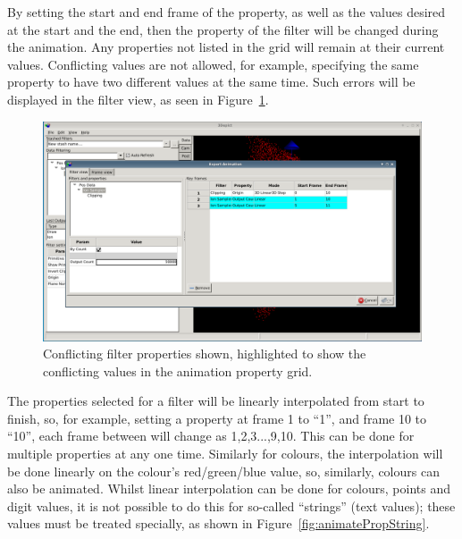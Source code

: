 \documentclass[10pt]{article}
\begin{document}
By setting the start and end frame of the property, as well as the values desired at the start and the end, then the property of the filter will be changed during the animation. Any properties not listed in the grid will remain at their current values. Conflicting values are not allowed, for example, specifying the same property to have two different values at the same time. Such errors will be displayed in the filter view, as seen in Figure~\ref{fig:animateParamConflict}. 

\begin{figure}
\begin{center}
 \includegraphics[width=0.9 \textwidth,keepaspectratio=true]{./figures/exportanimDialogConflict.png}
 \caption{Conflicting filter properties shown, highlighted to show the conflicting values in the animation property grid.}
\label{fig:animateParamConflict}
\centering
\end{center}
\end{figure}

The properties selected for a filter will be linearly interpolated from start to finish, so, for example, setting a property at frame 1 to ``1'', and frame 10 to ``10'', each frame between will change as 1,2,3...,9,10. This can be done for multiple properties at any one time. Similarly for colours, the interpolation will be done linearly on the colour's red/green/blue value, so, similarly, colours can also be animated. Whilst linear interpolation can be done for colours, points and digit values, it is not possible to do this for so-called ``strings'' (text values); these values must be treated specially, as shown in Figure~\ref{fig:animatePropString}.
\end{document}
